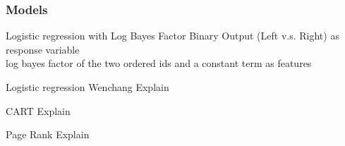 \documentclass[fleqn]{beamer}
\begin{document}
\begin{frame}
\frametitle{Models}

     \begin{beamerboxesrounded}{Logistic regression with Log Bayes Factor}
         Binary Output (Left v.s. Right) as response variable\\
         log bayes factor of the two ordered ids and a constant term as features
     \end{beamerboxesrounded}

     \begin{beamerboxesrounded}{Logistic regression Wenchang}
         Explain
     \end{beamerboxesrounded}

     \begin{beamerboxesrounded}{CART}
         Explain
      \end{beamerboxesrounded}
     
      \begin{beamerboxesrounded}{Page Rank}
         Explain
     \end{beamerboxesrounded}

\end{frame}
\end{document}
